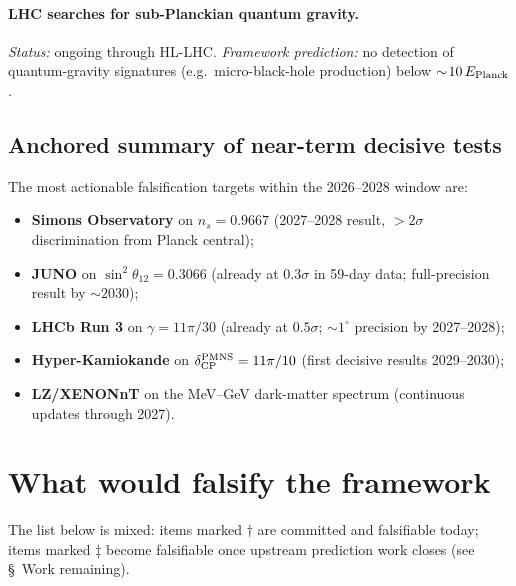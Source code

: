 \documentclass[reprint,amsmath,amssymb,aps,prd,longbibliography,floatfix]{revtex4-2}
\begin{document}
\paragraph{LHC searches for sub-Planckian quantum gravity.}
\emph{Status:} ongoing through HL-LHC. \emph{Framework prediction:}
no detection of quantum-gravity signatures (e.g.\ micro-black-hole
production) below $\sim\!10\,E_{\rm Planck}$.

\subsection*{Anchored summary of near-term decisive tests}

The most actionable falsification targets within the 2026--2028
window are:
\begin{itemize}\itemsep0pt
\item \textbf{Simons Observatory} on $n_s = 0.9667$ (2027--2028
result, $>2\sigma$ discrimination from Planck central);
\item \textbf{JUNO} on $\sin^2\theta_{12} = 0.3066$ (already at
$0.3\sigma$ in 59-day data; full-precision result by $\sim\!2030$);
\item \textbf{LHCb Run 3} on $\gamma = 11\pi/30$ (already at
$0.5\sigma$; $\sim\!1^\circ$ precision by 2027--2028);
\item \textbf{Hyper-Kamiokande} on $\delta_{\rm CP}^{\rm PMNS} =
11\pi/10$ (first decisive results 2029--2030);
\item \textbf{LZ/XENONnT} on the MeV--GeV dark-matter spectrum
(continuous updates through 2027).
\end{itemize}

\section{What would falsify the framework}

The list below is mixed: items marked $\dagger$ are committed and
falsifiable today; items marked $\ddagger$ become falsifiable once
upstream prediction work closes (see \S~Work remaining).
\end{document}
